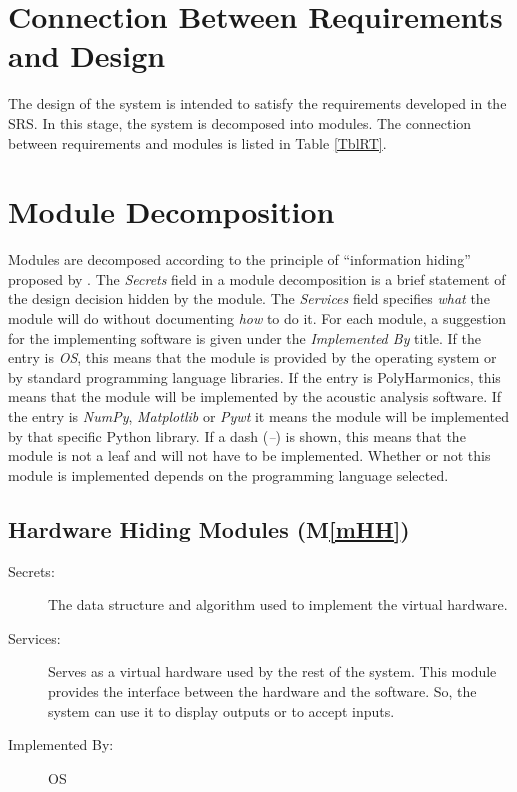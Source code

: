 \documentclass[12pt]{article}
\newcommand{\mref}[1]{M\ref{#1}}
\newcommand{\progname}{PolyHarmonics}
\begin{document}
\section{Connection Between Requirements and Design} \label{SecConnection}

The design of the system is intended to satisfy the requirements developed in
the SRS. In this stage, the system is decomposed into modules. The connection
between requirements and modules is listed in Table \ref{TblRT}.

\section{Module Decomposition} \label{SecMD}
Modules are decomposed according to the principle of ``information hiding''
proposed by \citet{ParnasEtAl1984}. The \emph{Secrets} field in a module
decomposition is a brief statement of the design decision hidden by the
module. The \emph{Services} field specifies \emph{what} the module will do
without documenting \emph{how} to do it. For each module, a suggestion for the
implementing software is given under the \emph{Implemented By} title. If the
entry is \emph{OS}, this means that the module is provided by the operating
system or by standard programming language libraries. If the entry is
\progname{}, this means that the module will be implemented by the 
acoustic analysis software. If the entry is \emph{NumPy}, \emph{Matplotlib} or
 \emph{Pywt} it means the module will be implemented by that specific Python 
library. If a dash (\emph{--}) is shown, this means
that the module is not a leaf and will not have to be implemented. Whether or
not this module is implemented depends on the programming language
selected.

\subsection{Hardware Hiding Modules (\mref{mHH})}

\begin{description}
\item[Secrets:]The data structure and algorithm used to implement the virtual
  hardware.
\item[Services:]Serves as a virtual hardware used by the rest of the
  system. This module provides the interface between the hardware and the
  software. So, the system can use it to display outputs or to accept inputs.
\item[Implemented By:] OS
\end{description}
\end{document}

